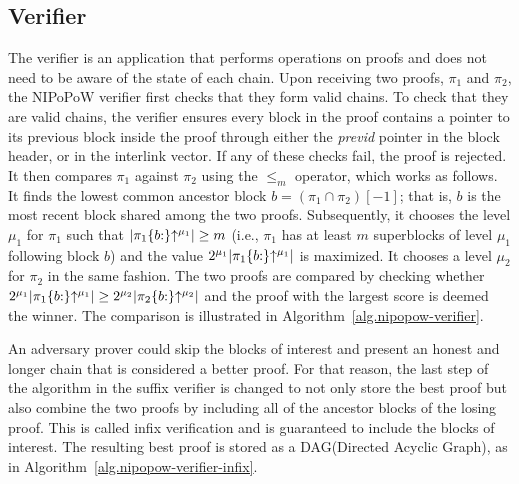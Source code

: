 \subsection{Verifier} The verifier is an application that performs
operations on proofs and does not need to be aware of the state of each chain.
Upon receiving two proofs, $\pi_1$ and $\pi_2$, the NIPoPoW verifier first
checks that they form valid chains. To check that they are valid chains, the
verifier ensures every block in the proof contains a pointer to its previous
block inside the proof through either the \emph{previd} pointer in the block
header, or in the interlink vector. If any of these checks fail, the proof is
rejected.  It then compares $\pi_1$ against $\pi_2$ using the $\leq_m$
operator, which works as follows. It finds the lowest common ancestor block $b
= (\pi_1 \cap \pi_2)[-1]$; that is, $b$ is the most recent block shared among
the two proofs.  Subsequently, it chooses the level $\mu_1$ for $\pi_1$ such
that $\lvert \pi_1\{b{:}\}\negthickspace\uparrow^{\mu_1} \rvert \geq m$ (i.e., $\pi_1$ has at
least $m$ superblocks of level $\mu_1$ following block $b$) and the value
$2^{\mu_1} \lvert \pi_1\{b{:}\}\negthickspace\uparrow^{\mu_1} \rvert$ is maximized.  It
chooses a level $\mu_2$ for $\pi_2$ in the same fashion. The two proofs are
compared by checking whether $2^{\mu_1} \lvert \pi_1\{b{:}\}\negthickspace\uparrow^{\mu_1}
\rvert \geq 2^{\mu_2} \lvert \pi_2\{b{:}\}\negthickspace\uparrow^{\mu_2} \rvert$ and the
proof with the largest score is deemed the winner. The comparison is
illustrated in Algorithm~\ref{alg.nipopow-verifier}.





An adversary prover could skip the blocks of interest and present an honest and
longer chain that is considered a better proof. For that reason, the last step
of the algorithm in the suffix verifier is changed to not only store the best
proof but also combine the two proofs by including all of the ancestor blocks
of the losing proof. This is called infix verification and is guaranteed to
include the blocks of interest. The resulting best proof is stored as a
DAG(Directed Acyclic Graph), as in Algorithm~\ref{alg.nipopow-verifier-infix}.

